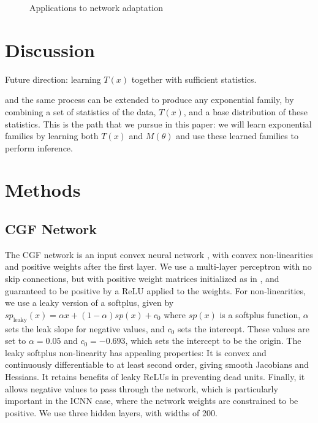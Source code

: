 \documentclass[11pt]{article}      %
\begin{document}
\begin{figure}[tb]
  \centering
  \begin{subfigure}[t]{\textwidth}
    \centering
    \caption{}
    \label{fig:3a_adaptation_example}
  \end{subfigure}

  \caption{Applications to network adaptation }
  \label{fig:3_adaptation_example}
\end{figure}




\newpage





\section{Discussion}

Future direction: learning $T(x)$ together with sufficient statistics.


and the same process can be extended to produce any exponential family, by combining a set of statistics of the data, $T(x)$, and a base distribution of these statistics.
This is the path that we pursue in this paper: we will learn exponential families by learning both $T(x)$ and $M(\theta)$ and use these learned families to perform inference.



\section{Methods}
\subsection{CGF Network} \label{sec:network_architecture}

The CGF network is an input convex neural network \cite{amos_input_2017}, with convex non-linearities and positive weights after the first layer.
We use a multi-layer perceptron with no skip connections, but with positive weight matrices initialized as in \cite{hoedt_principled_2023}, and guaranteed to be positive by a ReLU applied to the weights.
For non-linearities, we use a leaky version of a softplus, given by $sp_{\textrm{leaky}}(x) = \alpha x + (1 - \alpha) sp(x) + c_0$ where $sp(x)$ is a softplus function, $\alpha$ sets the leak slope for negative values, and $c_0$ sets the intercept. 
These values are set to $\alpha =0.05$ and $c_0 = -0.693$, which sets the intercept to be the origin. 
The leaky softplus non-linearity has appealing properties:
It is convex and continuously differentiable to at least second order, giving smooth Jacobians and Hessians.
It retains benefits of leaky ReLUs in preventing dead units.
Finally, it allows negative values to pass through the network, which is particularly important in the ICNN case, where the network weights are constrained to be positive.
We use three hidden layers, with widths of 200.
\end{document}
